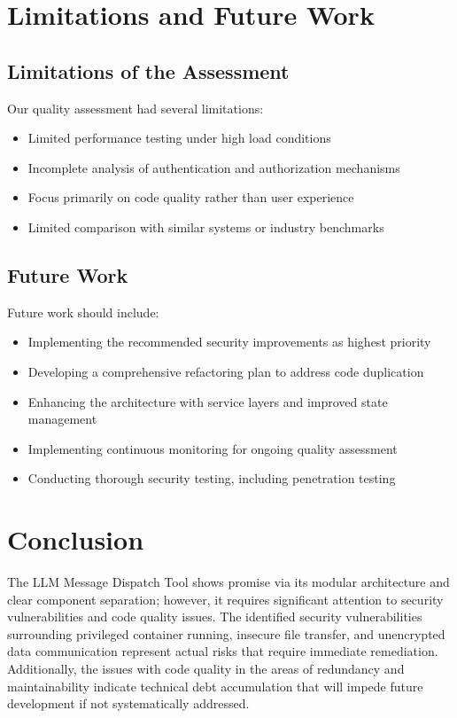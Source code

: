 \documentclass[sigconf]{acmart}
\begin{document}
\section{Limitations and Future Work}
\subsection{Limitations of the Assessment}
Our quality assessment had several limitations:
\begin{itemize}
\item Limited performance testing under high load conditions
\item Incomplete analysis of authentication and authorization mechanisms
\item Focus primarily on code quality rather than user experience
\item Limited comparison with similar systems or industry benchmarks
\end{itemize}

\subsection{Future Work}
Future work should include:
\begin{itemize}
\item Implementing the recommended security improvements as highest priority
\item Developing a comprehensive refactoring plan to address code duplication
\item Enhancing the architecture with service layers and improved state management
\item Implementing continuous monitoring for ongoing quality assessment
\item Conducting thorough security testing, including penetration testing
\end{itemize}

\section{Conclusion}
The LLM Message Dispatch Tool shows promise via its modular architecture and clear component separation; however, it requires significant attention to security vulnerabilities and code quality issues. The identified security vulnerabilities surrounding privileged container running, insecure file transfer, and unencrypted data communication represent actual risks that require immediate remediation. Additionally, the issues with code quality in the areas of redundancy and maintainability indicate technical debt accumulation that will impede future development if not systematically addressed.
\end{document}
